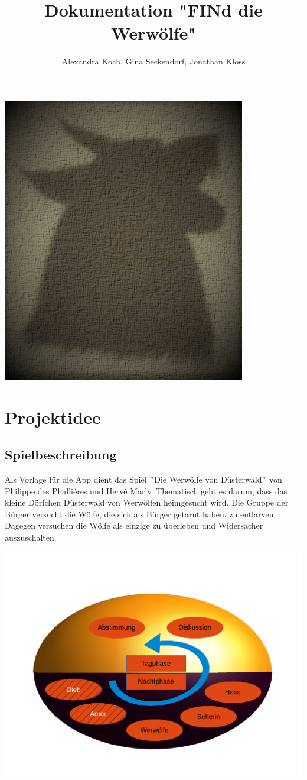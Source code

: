 \documentclass[12pt, a4paper]{article}
\title{Dokumentation "FINd die Werwölfe"}
\author{Alexandra Koch, Gina Seckendorf, Jonathan Kloss}
\begin{document}
\maketitle
\begin{center} \includegraphics{wolf} \end{center}
\newpage
\tableofcontents
\setcounter{tocdepth}{4}

\newpage
\section{Projektidee}

	\subsection{Spielbeschreibung}
Als Vorlage für die App dient das Spiel $"$Die Werwölfe von Düsterwald$"$ von Philippe des Phalliéres und Hervé Marly. Thematisch geht es darum, dass das kleine Dörfchen Düsterwald von Werwölfen heimgesucht wird. Die Gruppe der Bürger versucht die Wölfe, die sich als Bürger getarnt haben, zu entlarven. Dagegen versuchen die Wölfe als einzige zu überleben und Widersacher auszuschalten.

\begin{center}
\includegraphics[width = 9 cm]{ablauf.png}
\end{center}
\end{document}
